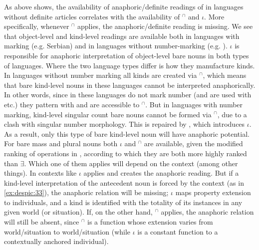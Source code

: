 \documentclass[output=paper,
modfonts
]{langscibook}
\begin{document}
	As  above shows, the availability of anaphoric/definite readings of  in languages without definite articles correlates with the availability of $^\cap$ and $\iota$. More specifically, whenever $^\cap$ applies, the anaphoric/definite reading is missing. We see that object-level and kind-level readings are available both in languages with  marking (e.g. Serbian) and in languages without number-marking (e.g. ). $\iota$ is responsible for anaphoric interpretation of object-level bare nouns in both types of languages. Where the two language types differ is how they manufacture kinds. In languages without number marking all kinds are created via $^\cap$, which means that bare kind-level nouns in these languages cannot be interpreted anaphorically. In other words, since  in these languages do not mark number (and are used with  etc.) they pattern with  and are accessible to $^\cap$. But in languages with number marking, kind-level singular count bare nouns cannot be formed via $^\cap$, due to a clash with singular number morphology. This is repaired by , which introduces $\iota$. As a result, only this type of bare kind-level noun will have anaphoric potential. For bare mass and plural nouns both $\iota$ and $^\cap$ are available, given the modified ranking of operations in , according to which they are both more highly ranked than $\exists$. 
	Which one of them applies will depend on the context (among other things). In contexts like  $\iota$ applies and creates the anaphoric reading. But if a kind-level interpretation of the antecedent noun is forced by the context (as in \ref{ex:despic:33}), the anaphoric relation will be missing; $\iota$ maps property extension to individuals, and a kind is identified with the totality of its instances in any given world (or situation). If, on the other hand, $^\cap$ applies, the anaphoric relation will still be absent, since $^\cap$ is a function whose extension varies from world/situation to world/situation (while $\iota$ is a constant function to a contextually anchored individual).
	
\end{document}
